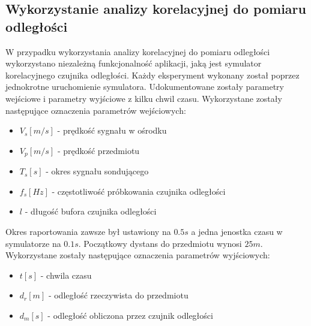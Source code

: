 \documentclass[12pt]{article}
\begin{document}
{        \subsection{Wykorzystanie analizy korelacyjnej do pomiaru odległości} {
            W przypadku wykorzystania analizy korelacyjnej do pomiaru odległości wykorzystano
            niezależną funkcjonalność aplikacji, jaką jest symulator korelacyjnego czujnika
            odległości. Każdy eksperyment wykonany został poprzez jednokrotne uruchomienie
            symulatora. Udokumentowane zostały parametry wejściowe i parametry wyjściowe z
            kilku chwil czasu. Wykorzystane zostały następujące oznaczenia parametrów
            wejściowych:
            \begin{itemize}
                \item $V_s[m/s]$ - prędkość sygnału w ośrodku
                \item $V_p[m/s]$ - prędkość przedmiotu
                \item $T_s[s]$ - okres sygnału sondującego
                \item $f_s[Hz]$ - częstotliwość próbkowania czujnika odległości
                \item $l$ - długość bufora czujnika odległości
            \end{itemize}
            Okres raportowania zawsze był ustawiony na $0.5s$ a jedna jenostka czasu w
            symulatorze na $0.1s$. Początkowy dystans do przedmiotu wynosi $25m$.
            Wykorzystane zostały następujące oznaczenia parametrów wyjściowych:
            \begin{itemize}
                \item $t[s]$ - chwila czasu
                \item $d_r[m]$ - odległość rzeczywista do przedmiotu
                \item $d_m[s]$ - odległość obliczona przez czujnik odległości
            \end{itemize}
        }
    }
    \newpage
\end{document}
